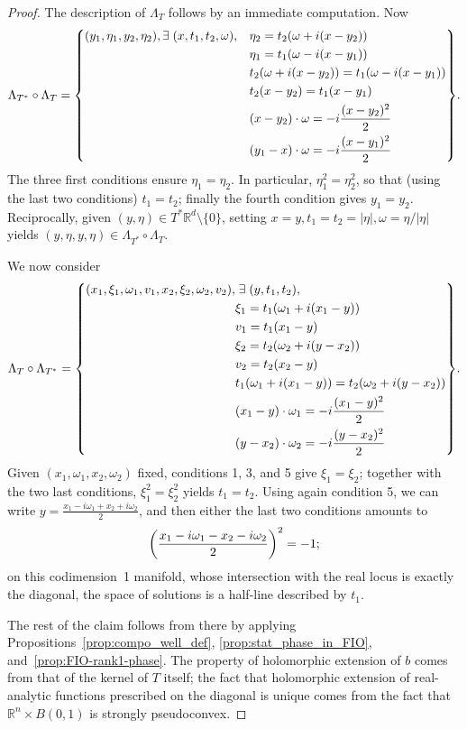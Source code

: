 \documentclass[10pt]{amsart}
\theoremstyle{definition}\newtheorem{defi}[theo]{Definition}\newtheorem{rema}[theo]{Remark}\newtheorem{exam}[theo]{Example}\newtheorem{exem}[theo]{Example}\newtheorem{nota}[theo]{Notation}
\newcommand\1{\mathds{1}}
\newcommand{\R}{\mathbb{R}}
\let\oldexists\exists
\renewcommand*{\exists}{\mathrel{\oldexists}}
\let\originalleft\left
\let\originalright\right
\renewcommand{\left}{\mathopen{}\mathclose\bgroup\originalleft}
\renewcommand{\right}{\aftergroup\egroup\originalright}
\begin{document}
\begin{proof}
The description of $\Lambda_T$ follows by an immediate computation. Now
\begin{align*}
\Lambda_{T^*}\circ \Lambda_T=\left\{
\begin{aligned}
(y_1,\eta_1,y_2,\eta_2),\exists (x,t_1,t_2,\omega),\quad &\eta_2=t_2(\omega+i(x-y_2))\\
&\eta_1=t_1(\omega-i(x-y_1))\\
&t_2(\omega+i(x-y_2))=t_1(\omega-i(x-y_1))\\
&t_2(x-y_2)=t_1(x-y_1)\\
&(x-y_2)\cdot \omega=-i\frac{(x-y_2)^2}{2}\\
&(y_1-x)\cdot \omega=-i\frac{(x-y_1)^2}{2}
\end{aligned}
\right\}.
\end{align*}
The three first conditions ensure $\eta_1=\eta_2$. In particular, $\eta_1^2=\eta_2^2$, so that (using the last two conditions) $t_1=t_2$; finally the fourth condition gives $y_1=y_2$. Reciprocally, given $(y,\eta)\in T^*\R^d\setminus \{0\}$, setting $x=y,t_1=t_2=|\eta|,\omega=\eta/|\eta|$ yields $(y,\eta,y,\eta)\in \Lambda_{T^*}\circ \Lambda_T$.

We now consider
\begin{align*}
\Lambda_{T}\circ \Lambda_{T^*}=
\left\{
\begin{aligned}
(x_1,\xi_1,\omega_1,v_1,x_2,\xi_2,\omega_2,v_2),&\exists (y,t_1,t_2),\,\\
&\xi_1=t_1(\omega_1+i(x_1-y))\\
&v_1=t_1(x_1-y)\\
&\xi_2=t_2(\omega_2+i(y-x_2))\\
&v_2=t_2(x_2-y)\\
&t_1(\omega_1+i(x_1-y))=t_2(\omega_2+i(y-x_2))\\
&(x_1-y)\cdot \omega_1=-i\frac{(x_1-y)^2}{2}\\
&(y-x_2)\cdot \omega_2=-i\frac{(y-x_2)^2}{2}
\end{aligned}
\right\}.
\end{align*}
Given $(x_1,\omega_1,x_2,\omega_2)$ fixed, conditions 1, 3, and 5 give $\xi_1=\xi_2$; together with the two last conditions, $\xi_1^2=\xi_2^2$ yields $t_1=t_2$. Using again condition 5, we can write $y=\frac{x_1-i\omega_1+x_2+i\omega_2}{2}$, and then either the last two conditions amounts to
\[
\left(\frac{x_1-i\omega_1-x_2-i\omega_2}{2}\right)^2=-1;
\]
on this codimension~1 manifold, whose intersection with the real locus is exactly the diagonal, the space of solutions is a half-line described by $t_1$.



The rest of the claim follows from there by applying Propositions~\ref{prop:compo_well_def}, \ref{prop:stat_phase_in_FIO}, and~\ref{prop:FIO-rank1-phase}. The property of holomorphic extension of $b$ comes from that of the kernel of $T$ itself; the fact that holomorphic extension of real-analytic functions prescribed on the diagonal is unique comes from the fact that $\R^n\times B(0,1)$ is strongly pseudoconvex.
\end{proof}
\end{document}
